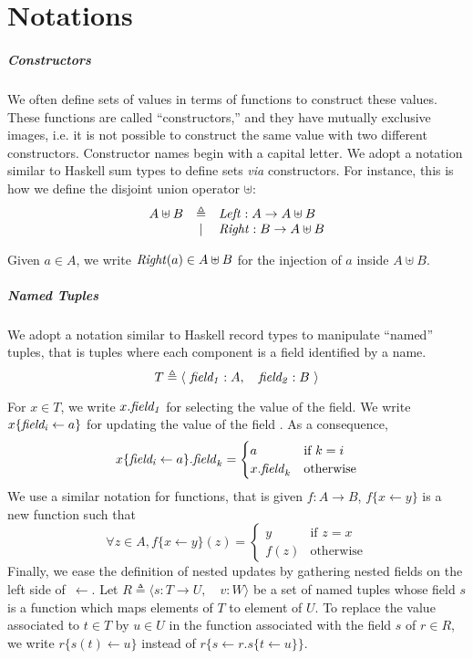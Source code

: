 \chapter{Notations}
\label{frontmatter:notations}

\paragraph{Constructors}
%
We often define sets of values in terms of functions to construct these values.
%
These functions are called ``constructors,'' and they have mutually exclusive
images, i.e. it is not possible to construct the same value with two different
constructors.
%
Constructor names begin with a capital letter.
%
We adopt a notation similar to Haskell sum types to define sets \emph{via}
constructors.
%
For instance, this is how we define the disjoint union operator $\uplus$:
%
\[
  \begin{array}{rcl}
    A \uplus B & \triangleq & \mathit{Left} : A \rightarrow A \uplus B \\
               & |          & \mathit{Right} : B \rightarrow A \uplus B
  \end{array}
\]

Given $a \in A$, we write $\mathit{Right}(a) \in A \uplus B$ for the injection of
$a$ inside $A \uplus B$.

\paragraph{Named Tuples}
%
We adopt a notation similar to Haskell record types to manipulate ``named''
tuples, that is tuples where each component is a field identified by a name.
%
\[
  T \triangleq \langle~\mathit{field_1} : A,\quad\mathit{field_2} : B~\rangle
\]

For $x \in T$, we write $x.\mathit{field_1}$ for selecting the value of the
 field. We write $x \{ \mathit{field_i} \leftarrow a \}$ for
updating the value of the field . As a consequence,
%
\[
  x \{ \mathit{field_i} \leftarrow a \}.\mathit{field}_k = \begin{cases}
    a & \text{if } k = i \\
    x.\mathit{field}_k & \text{otherwise}
  \end{cases}
\]
%
We use a similar notation for functions, that is given
\( f : A \rightarrow B \), \( f \{ x \leftarrow y \} \) is a new function such
that
%
\[
  \forall z \in A, f \{ x \leftarrow y \}(z) = \begin{cases}
    y & \text{if } z = x \\
    f(z) & \text{otherwise}
  \end{cases}
\]
%
Finally, we ease the definition of nested updates by gathering nested fields on
the left side of~\( \leftarrow \).
%
Let \( R \triangleq \langle s : T \rightarrow U,\quad v : W \rangle \) be a set
of named tuples whose field \( s \) is a function which maps elements of \( T \)
to element of \( U \).
%
To replace the value associated to \( t \in T \) by \( u \in U \) in the
function associated with the field \( s \) of \( r \in R \), we write
\( r \{ s(t) \leftarrow u \} \) instead of
\( r \{ s \leftarrow r.s \{ t \leftarrow u \} \} \).
